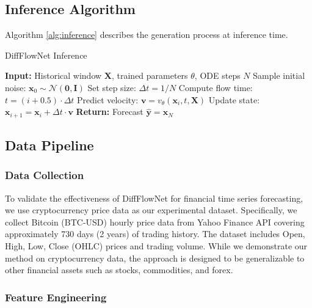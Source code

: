 \documentclass[11pt,a4paper]{article}
\begin{document}
\subsection{Inference Algorithm}

Algorithm \ref{alg:inference} describes the generation process at inference time.

\begin{algorithm}
\caption{DiffFlowNet Inference}
\label{alg:inference}
\begin{algorithmic}[1]
\STATE \textbf{Input:} Historical window $\mathbf{X}$, trained parameters $\theta$, ODE steps $N$
\STATE Sample initial noise: $\mathbf{x}_0 \sim \mathcal{N}(\mathbf{0}, \mathbf{I})$
\STATE Set step size: $\Delta t = 1/N$
    \STATE Compute flow time: $t = (i + 0.5) \cdot \Delta t$
    \STATE Predict velocity: $\mathbf{v} = v_\theta(\mathbf{x}_i, t, \mathbf{X})$
    \STATE Update state: $\mathbf{x}_{i+1} = \mathbf{x}_i + \Delta t \cdot \mathbf{v}$
\ENDFOR
\STATE \textbf{Return:} Forecast $\hat{\mathbf{y}} = \mathbf{x}_N$
\end{algorithmic}
\end{algorithm}

\subsection{Data Pipeline}

\subsubsection{Data Collection}

To validate the effectiveness of DiffFlowNet for financial time series forecasting, we use cryptocurrency price data as our experimental dataset. Specifically, we collect Bitcoin (BTC-USD) hourly price data from Yahoo Finance API covering approximately 730 days (2 years) of trading history. The dataset includes Open, High, Low, Close (OHLC) prices and trading volume. While we demonstrate our method on cryptocurrency data, the approach is designed to be generalizable to other financial assets such as stocks, commodities, and forex.

\subsubsection{Feature Engineering}
\end{document}
